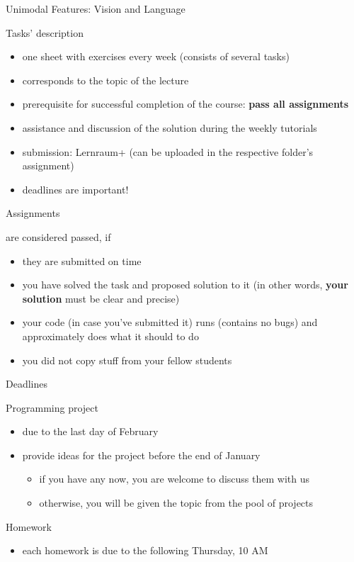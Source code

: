 \documentclass[notes=hide]{beamer}
\begin{document}
\begin{frame}{Unimodal Features: Vision and Language}
\small
\end{frame}




\begin{frame}{Tasks' description}
 \begin{itemize}
  \item one sheet with exercises every week (consists of several tasks)
  \item corresponds to the topic of the lecture
  \item prerequisite for successful completion of the course: {\bf pass all assignments}
  \item assistance and discussion of the solution during the weekly tutorials
  \item submission: Lernraum+ (can be uploaded in the respective folder's assignment)
  \item deadlines are important!
 \end{itemize}
\end{frame}

\begin{frame}{Assignments}

are considered passed, if

 \begin{itemize}
 \item they are submitted on time
  \item you have solved the task and proposed solution to it (in other words, \textbf{your solution} must be clear and precise)
  \item your code (in case you've submitted it) runs (contains no bugs) and approximately does what it should to do
  \item you did not copy stuff from your fellow students
 \end{itemize}
\end{frame}

\begin{frame}{Deadlines}
 \begin{block}{Programming project}
 \begin{itemize}
	\item due to the last day of February
	\item provide ideas for the project before the end of January
	 \begin{itemize}
		\item if you have any now, you are welcome to discuss them with us
		\item otherwise, you will be given the topic from the pool of projects
	\end{itemize}
\end{itemize}
 \end{block}
 \begin{block}{Homework}
  \begin{itemize}
  \item each homework is due to the following Thursday, 10 AM
  \end{itemize}
 \end{block}
\end{frame}
\end{document}
